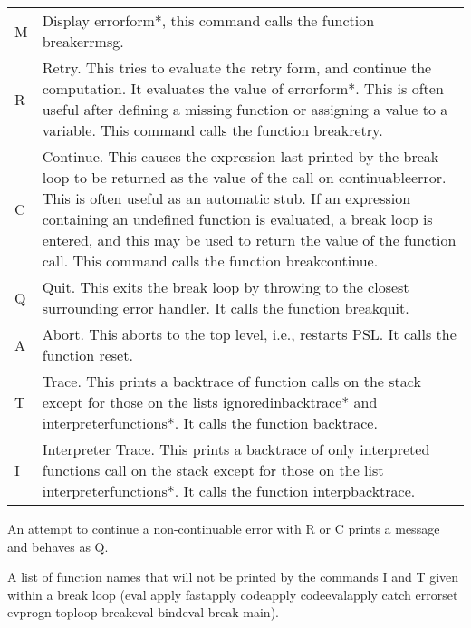 \begin{tabular}{lp{14.0cm}}

M & Display errorform*, this command calls the function 
breakerrmsg.\\

R & Retry. This tries to evaluate the retry form, and 
	 continue the computation. It evaluates the value of
	errorform*. This is often useful after defining a 
	missing function or assigning a value to a variable. 
	This command calls the function breakretry.\\

C &          Continue. This causes the expression last printed
             by  the  break loop to be returned as the value of
             the  call  on  continuableerror.   This  is  often
             useful  as  an  automatic  stub.  If an expression
             containing an undefined function is  evaluated,  a
             break  loop  is  entered,  and this may be used to
             return the value  of  the  function  call.    This
             command calls the function breakcontinue.\\

Q &          Quit. This exits the break loop by throwing to
             the closest surrounding error handler. It  calls
             the function breakquit.\\

A &          Abort. This  aborts  to  the  top  level, i.e.,
             restarts PSL. It calls the function reset.\\

T &          Trace. This prints a backtrace of function calls
             on the stack except for those on the lists
             ignoredinbacktrace* and interpreterfunctions*. It
             calls the function backtrace.\\

I &          Interpreter  Trace. This prints a backtrace of
             only interpreted functions call on the stack
             except for those on the list interpreterfunctions*.
													It calls  the  function interpbacktrace.
\end{tabular}

\vspace{0.5cm}
An  attempt  to  continue  a non-continuable error with R or C
prints a message and behaves as Q.

{ A list of function names that will not  be  printed  by  the
  commands I and T given within a break loop
  (eval apply fastapply codeapply codeevalapply catch errorset
  evprogn toploop breakeval bindeval break main).
}

